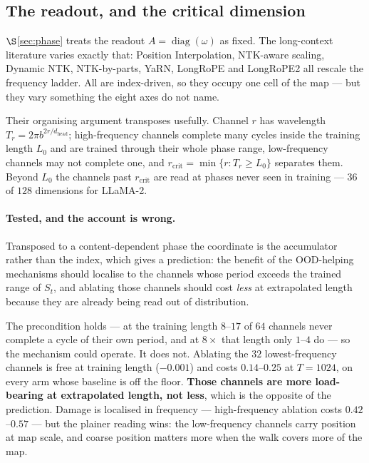\documentclass[11pt]{article}
\newcommand{\hd}{d_{\mathrm{head}}}
\begin{document}
\subsection{The readout, and the critical dimension}
\label{sec:readout}

$\S$\ref{sec:phase} treats the readout $A = \operatorname{diag}(\omega)$ as fixed. The
long-context literature varies exactly that: Position Interpolation, NTK-aware scaling,
Dynamic NTK, NTK-by-parts, YaRN, LongRoPE and LongRoPE2 all rescale the frequency
ladder. All are index-driven, so they occupy one cell of the map --- but they vary
something the eight axes do not name.

Their organising argument transposes usefully. Channel $r$ has wavelength
$T_r = 2\pi b^{2r/\hd}$; high-frequency channels complete many cycles inside the
training length $L_0$ and are trained through their whole phase range, low-frequency
channels may not complete one, and
$r_{\mathrm{crit}} = \min\{r : T_r \ge L_0\}$ separates them. Beyond $L_0$ the channels
past $r_{\mathrm{crit}}$ are read at phases never seen in training --- $36$ of $128$
dimensions for LLaMA-2.

\paragraph{Tested, and the account is wrong.} Transposed to a content-dependent
phase the coordinate is the accumulator rather than the index, which gives a
prediction: the benefit of the OOD-helping mechanisms should localise to the
channels whose period exceeds the trained range of $S_t$, and ablating those
channels should cost \emph{less} at extrapolated length because they are already
being read out of distribution.

The precondition holds --- at the training length $8$--$17$ of $64$ channels never
complete a cycle of their own period, and at $8\times$ that length only $1$--$4$ do
--- so the mechanism could operate. It does not. Ablating the $32$ lowest-frequency
channels is free at training length ($-0.001$) and costs $0.14$--$0.25$ at $T=1024$,
on every arm whose baseline is off the floor. \textbf{Those channels are more
load-bearing at extrapolated length, not less}, which is the opposite of the
prediction. Damage is localised in frequency --- high-frequency ablation costs
$0.42$--$0.57$ --- but the plainer reading wins: the low-frequency channels carry
position at map scale, and coarse position matters more when the walk covers more of
the map.
\end{document}
